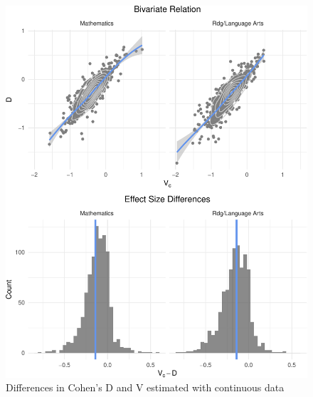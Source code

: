 \documentclass[man, fleqn, noextraspace]{apa6}
\theoremstyle{definition}
\theoremstyle{definition}
\theoremstyle{definition}
\theoremstyle{remark}
\begin{document}
\begin{figure}
\centering
\includegraphics{anderson_ncme18_files/figure-latex/unnamed-chunk-1-1.pdf}
\caption{\label{fig:unnamed-chunk-1}Differences in Cohen's D and V estimated
with continuous data}
\end{figure}
\end{document}
